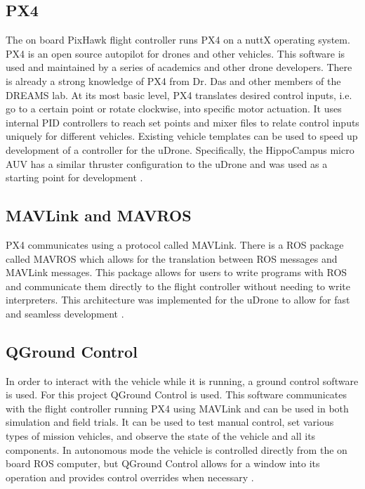 \subsection{PX4}
The on board PixHawk flight controller runs PX4 on a nuttX operating system. PX4 is an open source autopilot for drones and other vehicles. This software is used and maintained by a series of academics and other drone developers. There is already a strong knowledge of PX4 from Dr. Das and other members of the DREAMS lab. At its most basic level, PX4 translates desired control inputs, i.e. go to a certain point or rotate clockwise, into specific motor actuation. It uses internal PID controllers to reach set points and mixer files to relate control inputs uniquely for different vehicles. Existing vehicle templates can be used to speed up development of a controller for the uDrone. Specifically, the HippoCampus micro AUV has a similar thruster configuration to the uDrone and was used as a starting point for development \parencite{px4}. 

\subsection{MAVLink and MAVROS}
PX4 communicates using a protocol called MAVLink. There is a ROS package called MAVROS which allows for the translation between ROS messages and MAVLink messages. This package allows for users to write programs with ROS and communicate them directly to the flight controller without needing to write interpreters. This architecture was implemented for the uDrone to allow for fast and seamless development \parencite{mavros}.

\subsection{QGround Control}
In order to interact with the vehicle while it is running, a ground control software is used. For this project QGround Control is used. This software communicates with the flight controller running PX4 using MAVLink and can be used in both simulation and field trials. It can be used to test manual control, set various types of mission vehicles, and observe the state of the vehicle and all its components. In autonomous mode the vehicle is controlled directly from the on board ROS computer, but QGround Control allows for a window into its operation and provides control overrides when necessary \parencite{qgc}. 

